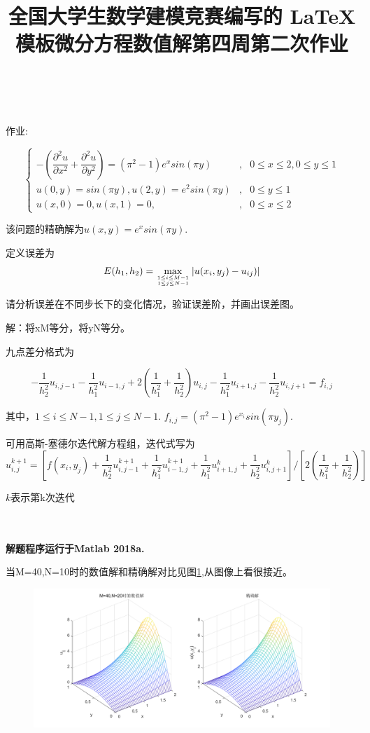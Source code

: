 \documentclass[withoutpreface,bwprint]{cumcmthesis} %
\title{全国大学生数学建模竞赛编写的 \LaTeX{} 模板}
\title{微分方程数值解第四周第二次作业}
\begin{document}
	\maketitle
	~\\
	~\\
	
	作业:
	
	$$
	\left\{
	\begin{array}{lcl}
	-(\dfrac{\partial^{2}{u}}{\partial{x^{2}}}+\dfrac{\partial^{2}{u}}{\partial{y^{2}}})=(\pi^{2}-1)e^{x}sin(\pi y) &,&0 \leq x \leq 2,0 \leq y \leq 1 \\
	
	u(0,y)=sin(\pi y),u(2,y)=e^{2}sin(\pi y) &, & 0 \leq y \leq 1 \\
	
	u(x,0)=0,u(x,1)=0,&, &0 \leq x \leq 2
	\end{array}
	\right.
	$$
	
	该问题的精确解为$ u(x,y)=e^{x}sin(\pi y)$.
	
	定义误差为$$ E(h_{1},h_{2})=\max \limits_{1 \leq i \leq M-1 \atop 1 \leq j \leq N-1 } |u(x_{i},y_{j})-u_{ij})| $$
	
	请分析误差在不同步长下的变化情况，验证误差阶，并画出误差图。

	
	
	解：将xM等分，将yN等分。
	
	九点差分格式为
	
	$$-\dfrac{1}{h_{2}^{2}}u_{i,j-1}-\dfrac{1}{h_{1}^{2}}u_{i-1,j}+2(\dfrac{1}{h_{1}^{2}}+\dfrac{1}{h_{2}^{2}})u_{i,j}-\dfrac{1}{h_{1}^{2}}u_{i+1,j}-\dfrac{1}{h_{2}^{2}}u_{i,j+1}=f_{i,j}$$
	
	其中，$ 1 \leq i \leq N-1 ,1 \leq j \leq N-1 $.
	$f_{i,j}=(\pi^{2}-1)e^{x_{i}}sin(\pi y_{j})$.
	

	可用高斯-塞德尔迭代解方程组，迭代式写为
	$$
	u_{i,j}^{k+1}=[f(x_{i},y_{j})+\dfrac{1}{h_{2}^{2}}u_{i,j-1}^{k+1}+\dfrac{1}{h_{1}^{2}}u_{i-1,j}^{k+1}+\dfrac{1}{h_{1}^{2}}u_{i+1,j}^{k}+\dfrac{1}{h_{2}^{2}}u_{i,j+1}^{k}]/[2(\dfrac{1}{h_{1}^{2}}+\dfrac{1}{h_{2}^{2}})]
	$$
	
	$k$表示第k次迭代
	
	~\\
	~\\
	
	
	\textbf{解题程序运行于Matlab 2018a.}
	
	当M=40,N=10时的数值解和精确解对比见图\ref{fig:f5},从图像上看很接近。
	\begin{figure}
		\centering
		\includegraphics[width=1\linewidth]{figures/f5}
		\caption[M=40,N=20的数值解和精确解]{}
		\label{fig:f5}
	\end{figure}
	
\end{document}
